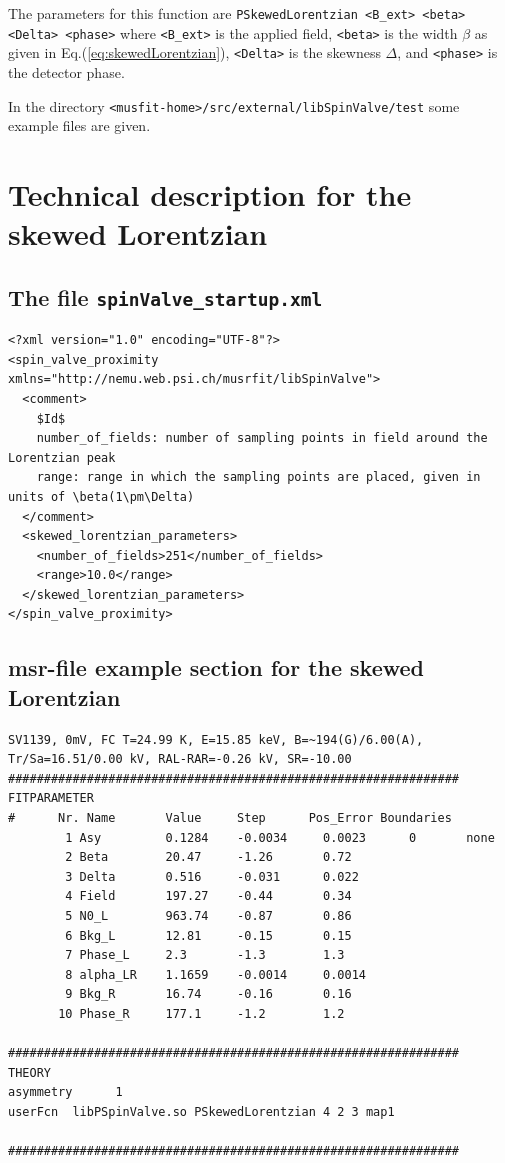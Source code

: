 \documentclass[twoside]{article}
\begin{document}
\noindent The parameters for this function are \verb!PSkewedLorentzian <B_ext> <beta> <Delta> <phase>! where \verb!<B_ext>! is the applied field, \verb!<beta>! is 
the width $\beta$ as given in Eq.(\ref{eq:skewedLorentzian}), \verb!<Delta>! is the skewness $\Delta$, and \verb!<phase>! is the detector phase.

In the directory \verb!<musfit-home>/src/external/libSpinValve/test! some example files are given.

\appendix

\section{Technical description for the skewed Lorentzian}

\subsection{The file \texttt{spinValve\_startup.xml}}\label{app:spinValve_startup}

\begin{verbatim}
<?xml version="1.0" encoding="UTF-8"?>
<spin_valve_proximity xmlns="http://nemu.web.psi.ch/musrfit/libSpinValve">
  <comment>
    $Id$
    number_of_fields: number of sampling points in field around the Lorentzian peak
    range: range in which the sampling points are placed, given in units of \beta(1\pm\Delta)
  </comment>
  <skewed_lorentzian_parameters>
    <number_of_fields>251</number_of_fields>
    <range>10.0</range>
  </skewed_lorentzian_parameters>
</spin_valve_proximity> 
\end{verbatim}

\subsection{msr-file example section for the skewed Lorentzian}

\small
\begin{verbatim}
SV1139, 0mV, FC T=24.99 K, E=15.85 keV, B=~194(G)/6.00(A), Tr/Sa=16.51/0.00 kV, RAL-RAR=-0.26 kV, SR=-10.00
###############################################################
FITPARAMETER
#      Nr. Name       Value     Step      Pos_Error Boundaries   
        1 Asy         0.1284    -0.0034     0.0023      0       none    
        2 Beta        20.47     -1.26       0.72        
        3 Delta       0.516     -0.031      0.022       
        4 Field       197.27    -0.44       0.34        
        5 N0_L        963.74    -0.87       0.86        
        6 Bkg_L       12.81     -0.15       0.15        
        7 Phase_L     2.3       -1.3        1.3         
        8 alpha_LR    1.1659    -0.0014     0.0014      
        9 Bkg_R       16.74     -0.16       0.16        
       10 Phase_R     177.1     -1.2        1.2         

###############################################################
THEORY
asymmetry      1
userFcn  libPSpinValve.so PSkewedLorentzian 4 2 3 map1

############################################################### 
\end{verbatim}
\normalsize
\end{document}
